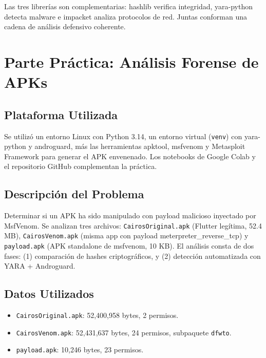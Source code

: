 \documentclass[12pt,a4paper]{article}
\begin{document}
Las tres librerías son complementarias: hashlib verifica integridad,
yara-python detecta malware e impacket analiza protocolos de red. Juntas
conforman una cadena de análisis defensivo coherente.

\section{Parte Práctica: Análisis Forense de APKs}

\subsection{Plataforma Utilizada}

Se utilizó un entorno Linux con Python 3.14, un entorno virtual
(\texttt{venv}) con yara-python y androguard, más las herramientas
apktool, msfvenom y Metasploit Framework para generar el APK envenenado.
Los notebooks de Google Colab y el repositorio GitHub complementan la
práctica.

\subsection{Descripción del Problema}

Determinar si un APK ha sido manipulado con payload malicioso inyectado
por MsfVenom. Se analizan tres archivos: \texttt{CairosOriginal.apk}
(Flutter legítima, 52.4 MB), \texttt{CairosVenom.apk} (misma app con
payload meterpreter\_reverse\_tcp) y \texttt{payload.apk} (APK standalone
de msfvenom, 10 KB). El análisis consta de dos fases: (1) comparación de
hashes criptográficos, y (2) detección automatizada con YARA + Androguard.

\subsection{Datos Utilizados}

\begin{itemize}
\item \texttt{CairosOriginal.apk}: 52,400,958 bytes, 2 permisos.
\item \texttt{CairosVenom.apk}: 52,431,637 bytes, 24 permisos, subpaquete \texttt{dfwto}.
\item \texttt{payload.apk}: 10,246 bytes, 23 permisos.
\end{itemize}
\end{document}
